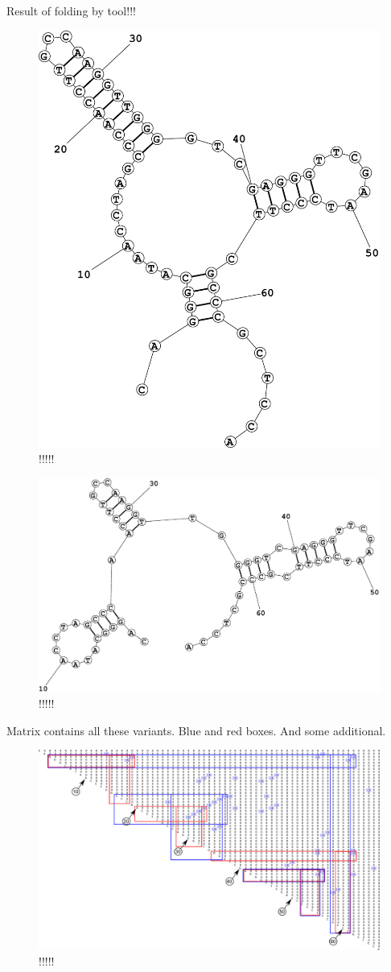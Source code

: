 \documentclass[a4paper,twoside]{article}
\begin{document}
Result of folding by tool!!!

\begin{figure}
\centering
\includegraphics[width=.5\textwidth]{figures/Fold1.pdf}
\caption{!!!!!}
\label{fig:!!!}
\end{figure}


\begin{figure}
\centering
\includegraphics[width=.5\textwidth]{figures/Fold2.pdf}
\caption{!!!!!}
\label{fig:!!!}
\end{figure}


Matrix contains all these variants.
Blue and red boxes.
And some additional.

\begin{figure}
\centering
\includegraphics[width=.98\textwidth]{figures/0m.pdf}
\caption{!!!!!}
\label{fig:!!!}
\end{figure}
\end{document}
